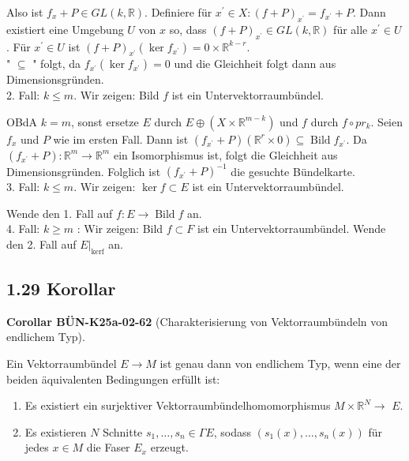 \documentclass[10pt, letterpaper]{article}
\newcommand{\CustomHeading}[3]{%
  \par\medskip\noindent%
  \textbf{#1 #2} \textnormal{(#3)}.\enskip%
}
\newenvironment{KORO}[2]{\begin{unitbox}\CustomHeading{Corollar}{#1}{#2}}{\end{unitbox}}
\begin{document}
Also ist $f_{x}+P \in G L(k, \mathbb{R})$. Definiere für $x^{\prime} \in X:(f+P)_{x^{\prime}}=f_{x^{\prime}}+P$. Dann existiert eine Umgebung $U$ von $x$ so, dass $(f+P)_{x^{\prime}} \in G L(k, \mathbb{R})$ für alle $x^{\prime} \in U$. Für $x^{\prime} \in U$ ist $(f+P)_{x^{\prime}}\left(\operatorname{ker} f_{x^{\prime}}\right)=0 \times \mathbb{R}^{k-r}$.\\
" $\subseteq$ " folgt, da $f_{x^{\prime}}\left(\operatorname{ker} f_{x^{\prime}}\right)=0$ und die Gleichheit folgt dann aus Dimensionsgründen.\\
2. Fall: $k \leq m$. Wir zeigen: Bild $f$ ist ein Untervektorraumbündel.

OBdA $k=m$, sonst ersetze $E$ durch $E \oplus\left(X \times \mathbb{R}^{m-k}\right)$ und $f$ durch $f \circ p r_{k}$. Seien $f_{x}$ und $P$ wie im ersten Fall. Dann ist $\left(f_{x^{\prime}}+P\right)\left(\mathbb{R}^{r} \times 0\right) \subseteq \operatorname{Bild} f_{x^{\prime}}$. Da $\left(f_{x^{\prime}}+P\right): \mathbb{R}^{m} \rightarrow \mathbb{R}^{m}$ ein Isomorphismus ist, folgt die Gleichheit aus Dimensionsgründen. Folglich ist $\left(f_{x^{\prime}}+P\right)^{-1}$ die gesuchte Bündelkarte.\\
3. Fall: $k \leq m$. Wir zeigen: $\operatorname{ker} f \subset E$ ist ein Untervektorraumbündel.

Wende den 1. Fall auf $f: E \rightarrow \operatorname{Bild} f$ an.\\
4. Fall: $k \geq m$ : Wir zeigen: Bild $f \subset F$ ist ein Untervektorraumbündel. Wende den 2. Fall auf $\left.E\right|_{\operatorname{kerf}}$ an.



\subsection*{1.29 Korollar}
\begin{KORO}{BÜN-K25a-02-62}{Charakterisierung von Vektorraumbündeln von endlichem Typ}
Ein Vektorraumbündel $E \rightarrow M$ ist genau dann von endlichem Typ, wenn eine der beiden äquivalenten Bedingungen erfüllt ist:
\begin{enumerate}
  \item Es existiert ein surjektiver Vektorraumbündelhomomorphismus $M \times \mathbb{R}^{N} \rightarrow$ $E$.
  \item Es existieren $N$ Schnitte $s_{1}, \ldots, s_{n} \in \Gamma E$, sodass $\left(s_{1}(x), \ldots, s_{n}(x)\right)$ für jedes $x \in M$ die Faser $E_{x}$ erzeugt.
\end{enumerate}
\end{KORO}
\end{document}
